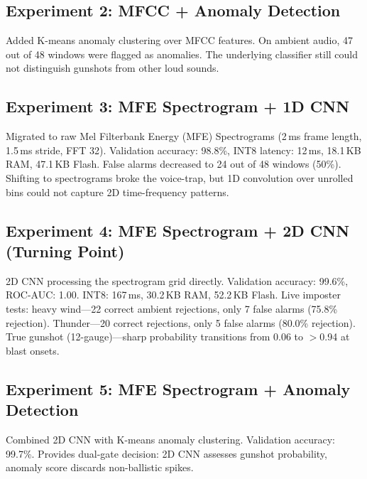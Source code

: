 \documentclass[conference]{IEEEtran}
\begin{document}
\subsection{Experiment 2: MFCC + Anomaly Detection}
Added K-means anomaly clustering over MFCC features. On ambient audio, 47 out of 48 windows were flagged as anomalies. The underlying classifier still could not distinguish gunshots from other loud sounds.

\subsection{Experiment 3: MFE Spectrogram + 1D CNN}
Migrated to raw Mel Filterbank Energy (MFE) Spectrograms (2\,ms frame length, 1.5\,ms stride, FFT 32). Validation accuracy: 98.8\%, INT8 latency: 12\,ms, 18.1\,KB RAM, 47.1\,KB Flash. False alarms decreased to 24 out of 48 windows (50\%). Shifting to spectrograms broke the voice-trap, but 1D convolution over unrolled bins could not capture 2D time-frequency patterns.

\subsection{Experiment 4: MFE Spectrogram + 2D CNN (Turning Point)}
2D CNN processing the spectrogram grid directly. Validation accuracy: 99.6\%, ROC-AUC: 1.00. INT8: 167\,ms, 30.2\,KB RAM, 52.2\,KB Flash. Live imposter tests: heavy wind---22 correct ambient rejections, only 7 false alarms (75.8\% rejection). Thunder---20 correct rejections, only 5 false alarms (80.0\% rejection). True gunshot (12-gauge)---sharp probability transitions from 0.06 to $>$0.94 at blast onsets.

\subsection{Experiment 5: MFE Spectrogram + Anomaly Detection}
Combined 2D CNN with K-means anomaly clustering. Validation accuracy: 99.7\%. Provides dual-gate decision: 2D CNN assesses gunshot probability, anomaly score discards non-ballistic spikes.
\end{document}
